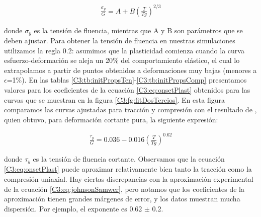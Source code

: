 \begin{eqnarray}
\frac{\sigma{}_{y}}{G} = A+B\left( \frac{T}{Tg} \right)^{2/3}
\label{C3:eq:onsetPlast}
\end{eqnarray}

donde $\sigma{}_{y}$ es la tensión de fluencia, mientras que A y B son parámetros que se deben ajustar. Para obtener la tensión de fluencia en nuestras simulaciones utilizamos la regla 0.2: asumimos que la plasticidad comienza cuando la curva esfuerzo-deformación se aleja un 20\% del comportamiento elástico, el cual lo extrapolamos a partir de puntos obtenidos a deformaciones muy bajas (menores a $\epsilon$=1\%). En las tablas \ref{C3:tb:initPropsTen}-\ref{C3:tb:initPropsComp} presentamos valores para los coeficientes de la ecuación \ref{C3:eq:onsetPlast} obtenidos para las curvas que se muestran en la figura \ref{C3:fg:fitDosTercios}. En esta figura comparamos las curvas ajustadas para tracción y compresión con el resultado de \cite{johnson05}, quien obtuvo, para  deformación cortante pura, la siguiente expresión:


\begin{eqnarray}
\frac{\tau _{y}}{G} = 0.036-0.016\left( \frac{T}{Tg} \right)^{0.62}
\label{C3:eq:johnsonSamwer}
\end{eqnarray}

donde $\tau _{y}$ es la tensión de fluencia cortante. Observamos que la ecuación \ref{C3:eq:onsetPlast} puede aproximar relativamente bien tanto la tracción como la compresión uniaxial. Hay ciertas discrepancias con la aproximación experimental de la ecuación \ref{C3:eq:johnsonSamwer}, pero notamos que los coeficientes de la aproximación tienen grandes márgenes de error, y los datos muestran mucha dispersión. Por ejemplo, el exponente es 0.62 $\pm$ 0.2.
	


